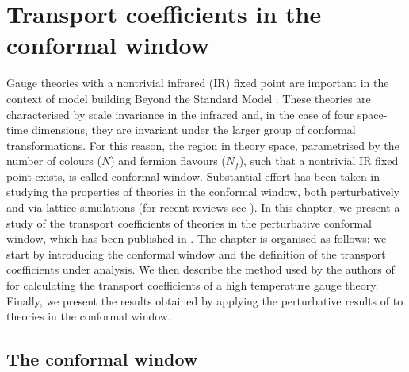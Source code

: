 \chapter{Transport coefficients in the conformal window}

Gauge theories with a nontrivial infrared (IR) fixed point are important in the context of model building Beyond the Standard Model \cite{Sannino:2008ha}. These theories are characterised by scale invariance in the infrared and, in the case of four space-time dimensions, they are invariant under the larger group of conformal transformations. For this reason, the region in theory space, parametrised by the number of colours ($N$) and fermion flavours ($N_f$), such that a nontrivial IR fixed point exists, is called conformal window.
Substantial effort has been taken in studying the properties of theories in the conformal window, both perturbatively  \cite{Ryttov:2010iz,Pica:2010xq,Mojaza:2012zd,Ryttov:2013hka,Ryttov:2013ura,Ryttov:2014nda,Ryttov:2016ner,Ryttov:2016asb,Ryttov:2016hal,Ryttov:2017toz,Ryttov:2017dhd,Ryttov:2017kmx} and via lattice simulations (for recent reviews see \cite{Svetitsky:2017xqk,Pica:2017gcb}). In this chapter, we present a study of the transport coefficients of theories in the perturbative conformal window, which has been published in \cite{Toniato:2016twr}. 
The chapter is organised as follows: we start by introducing the conformal window and the definition of the transport coefficients under analysis. We then describe the method used by the authors of \cite{Arnold:2000dr} for calculating the transport coefficients of a high temperature gauge theory. Finally, we present the results obtained by applying the perturbative results of \cite{Arnold:2000dr} to theories in the conformal window.  


\section{The conformal window}
\label{ conformal_window}


